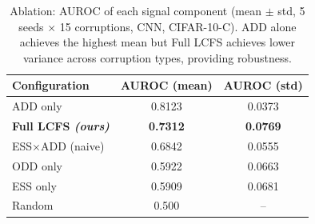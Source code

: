 \begin{table}[t]
\centering
\caption{Ablation: AUROC of each signal component (mean $\pm$ std, 5 seeds $\times$ 15 corruptions, CNN, CIFAR-10-C). ADD alone achieves the highest mean but Full LCFS achieves lower variance across corruption types, providing robustness.}
\label{tab:ablation}
\begin{tabular}{lcc}
\toprule
Configuration & AUROC (mean) & AUROC (std) \\
\midrule
ADD only & 0.8123 & 0.0373 \\
\textbf{Full LCFS \textit{(ours)}} & \textbf{0.7312} & \textbf{0.0769} \\
ESS$\times$ADD (naive) & 0.6842 & 0.0555 \\
ODD only & 0.5922 & 0.0663 \\
ESS only & 0.5909 & 0.0681 \\
\midrule
Random & 0.500 & -- \\
\bottomrule
\end{tabular}
\end{table}